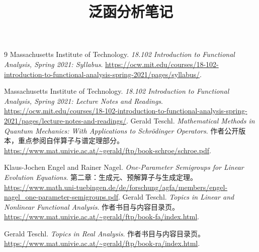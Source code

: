 \documentclass[UTF8,12pt,a4paper,fontset=fandol]{ctexbook}
\title{泛函分析笔记}
\author{}
\date{}
\begin{document}
\frontmatter %


\maketitle
\tableofcontents

\mainmatter


















\appendix





\begin{thebibliography}{9}
Massachusetts Institute of Technology.
\textit{18.102 Introduction to Functional Analysis, Spring 2021: Syllabus}.
\url{https://ocw.mit.edu/courses/18-102-introduction-to-functional-analysis-spring-2021/pages/syllabus/}.

Massachusetts Institute of Technology.
\textit{18.102 Introduction to Functional Analysis, Spring 2021: Lecture Notes and Readings}.
\url{https://ocw.mit.edu/courses/18-102-introduction-to-functional-analysis-spring-2021/pages/lecture-notes-and-readings/}.
Gerald Teschl.
\textit{Mathematical Methods in Quantum Mechanics: With Applications to Schrödinger Operators}.
作者公开版本，重点参阅自伴算子与谱定理部分。
\url{https://www.mat.univie.ac.at/~gerald/ftp/book-schroe/schroe.pdf}.

Klaus-Jochen Engel and Rainer Nagel.
\textit{One-Parameter Semigroups for Linear Evolution Equations}.
第二章：生成元、预解算子与生成定理。
\url{https://www.math.uni-tuebingen.de/de/forschung/agfa/members/engel-nagel_one-parameter-semigroups.pdf}.
Gerald Teschl.
\textit{Topics in Linear and Nonlinear Functional Analysis}.
作者书目与内容目录页。
\url{https://www.mat.univie.ac.at/~gerald/ftp/book-fa/index.html}.

Gerald Teschl.
\textit{Topics in Real Analysis}.
作者书目与内容目录页。
\url{https://www.mat.univie.ac.at/~gerald/ftp/book-ra/index.html}.
\end{thebibliography}
\end{document}
